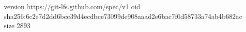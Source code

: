 version https://git-lfs.github.com/spec/v1
oid sha256:6c2e7d2dd6bcc39d4ecdbce73099de908aaad2e6bac7f0d58733a74ab4b682ac
size 2893

